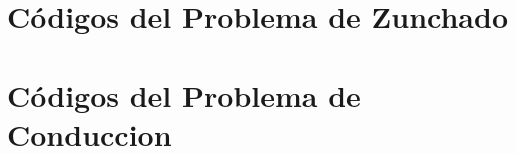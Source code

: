 \lstset{inputpath=codes}

\section{C\'odigos del Problema de Zunchado}
















\clearpage

\section{C\'odigos del Problema de Conduccion}



